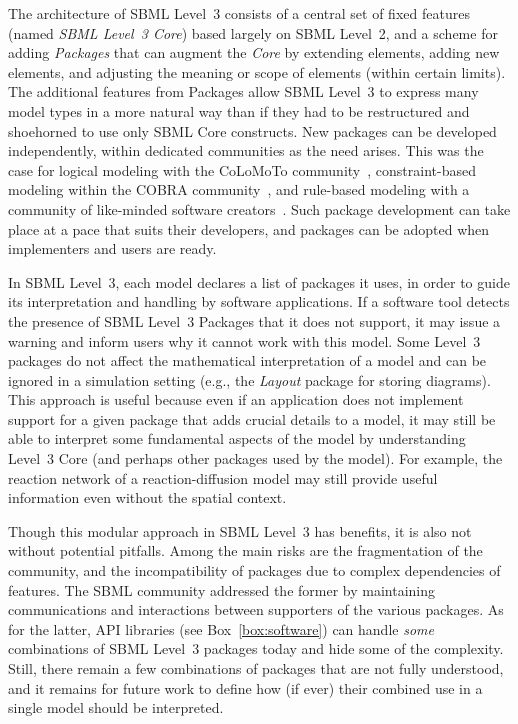 \documentclass[]{draft-sbml-paper}
\begin{document}
The architecture of SBML Level~3 consists of a central set of fixed features (named \emph{SBML Level~3 Core}) based largely on SBML Level~2, and a scheme for adding \emph{Packages} that can augment the \emph{Core} by extending elements, adding new elements, and adjusting the meaning or scope of elements (within certain limits). The additional features from Packages allow SBML Level~3 to express many model types in a more natural way than if they had to be restructured and shoehorned to use only SBML Core constructs.  New packages can be developed independently, within dedicated communities as the need arises. This was the case for logical modeling with the CoLoMoTo community~\citep{naldi2015cooperative}, constraint-based modeling within the COBRA community~\citep{Ebrahim2015}, and rule-based modeling with a community of like-minded software creators~\citep{Blinov2004, Danos2007rulebased, Palmisano2014multistate, Sneddon2011efficient, zhang2013simmune}. Such package development can take place at a pace that suits their developers, and packages can be adopted when implementers and users are ready.

In SBML Level~3, each model declares a list of packages it uses, in order to guide its interpretation and handling by software applications. If a software tool detects the presence of SBML Level~3 Packages that it does not support, it may issue a warning and inform users why it cannot work with this model. Some Level~3 packages do not affect the mathematical interpretation of a model and can be ignored in a simulation setting (e.g., the \emph{Layout} package for storing diagrams).  This approach is useful because even if an application does not implement support for a given package that adds crucial details to a model, it may still be able to interpret some fundamental aspects of the model by understanding Level~3 Core (and perhaps other packages used by the model). For example, the reaction network of a reaction-diffusion model may still provide useful information even without the spatial context.

Though this modular approach in SBML Level~3 has benefits, it is also not without potential pitfalls. Among the main risks are the fragmentation of the community, and the incompatibility of packages due to complex dependencies of features. The SBML community addressed the former by maintaining communications and interactions between supporters of the various packages. As for the latter, API libraries (see Box~\ref{box:software}) can handle \emph{some} combinations of SBML Level~3 packages today and hide some of the complexity.  Still, there remain a few combinations of packages that are not fully understood, and it remains for future work to define how (if ever) their combined use in a single model should be interpreted.
\end{document}
